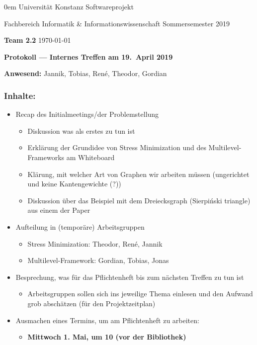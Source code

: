 \documentclass[11pt]{article} %
\newcommand{\names}{Team 2.2}
\begin{document}
\thispagestyle{plain}
{\footnotesize \parindent0em
    {\sc Universität Konstanz} \hfill {\sc Softwareprojekt}\par
    {\sc Fachbereich Informatik \& Informationswissenschaft} \hfill Sommersemester 2019 \par
    \textbf{\names} \hfill \today\par
    \begin{center}
      {\Large\bf Protokoll --- Internes Treffen am 19.\ April 2019}
    \end{center}}
  \par{\textbf{Anwesend:}} Jannik, Tobias, René, Theodor, Gordian
\subsubsection*{Inhalte:}
  \begin{itemize}
  \item Recap des Initialmeetings/der Problemstellung
    \begin{itemize}
    \item Diskussion was als erstes zu tun ist
    \item Erklärung der Grundidee von Stress Minimization und
      des Multilevel-Frameworks am Whiteboard
    \item Klärung, mit welcher Art von Graphen wir arbeiten müssen
      (ungerichtet und keine Kantengewichte (?))
    \item Diskussion über das Beispiel mit dem Dreiecksgraph (Sierpiński triangle) aus einem der Paper
    \end{itemize}
  \item Aufteilung in (temporäre) Arbeitsgruppen
    \begin{itemize}
    \item Stress Minimization: Theodor, René, Jannik
    \item Multilevel-Framework: Gordian, Tobias, Jonas
    \end{itemize}
  \item Besprechung, was für das Pflichtenheft bis zum nächsten Treffen zu tun ist
    \begin{itemize}
    \item Arbeitsgruppen sollen sich ins jeweilige Thema einlesen und den Aufwand grob abschätzen (für den Projektzeitplan)
    \end{itemize}
  \item Ausmachen eines Termins, um am Pflichtenheft zu arbeiten:
    \begin{itemize}
    \item {\large \bf Mittwoch 1. Mai, um 10 (vor der Bibliothek)}
    \end{itemize}
  \end{itemize}  
\end{document}
